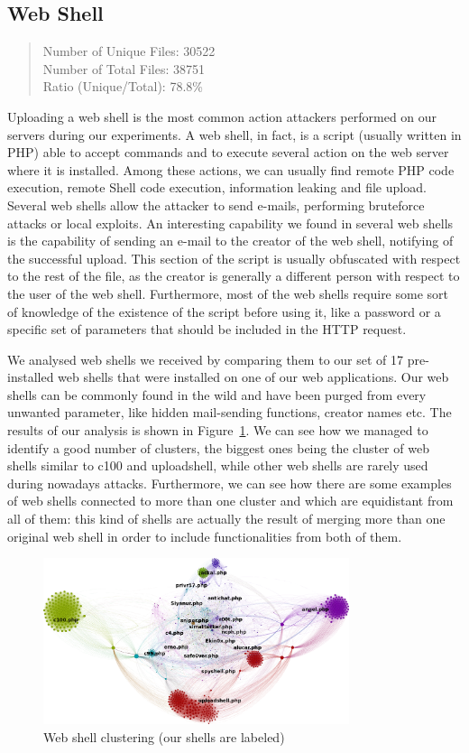 \subsection{Web Shell}

\begin{quote}
Number of Unique Files: 30522\\
Number of Total Files: 38751\\
Ratio (Unique/Total): 78.8\%
\end{quote}

Uploading a web shell is the most common action attackers performed on our servers during our experiments. A web shell, in fact, is a script (usually written in PHP) able to accept commands and to execute several action on the web server where it is installed. Among these actions, we can usually find remote PHP code execution, remote Shell code execution, information leaking and file upload. Several web shells allow the attacker to send e-mails, performing bruteforce attacks or local exploits. An interesting capability we found in several web shells is the capability of sending an e-mail to the creator of the web shell, notifying of the successful upload. This section of the script is usually obfuscated with respect to the rest of the file, as the creator is generally a different person with respect to the user of the web shell. Furthermore, most of the web shells require some sort of knowledge of the existence of the script before using it, like a password or a specific set of parameters that should be included in the HTTP request.

We analysed web shells we received by comparing them to our set of 17 pre-installed web shells that were installed on one of our web applications. Our web shells can be commonly found in the wild and have been purged from every unwanted parameter, like hidden mail-sending functions, creator names etc. The results of our analysis is shown in Figure~\ref{fig:shellsClusters}. We can see how we managed to identify a good number of clusters, the biggest ones being the cluster of web shells similar to c100 and uploadshell, while other web shells are rarely used during nowadays attacks.
Furthermore, we can see how there are some examples of web shells connected to more than one cluster and which are equidistant from all of them: this kind of shells are actually the result of merging more than one original web shell in order to include functionalities from both of them.


\begin{figure}[H]
\centerline{\includegraphics[width=0.8\textwidth]{Images/shellsClusters.png}}
\caption{Web shell clustering (our shells are labeled)\label{fig:shellsClusters}}
\end{figure}
